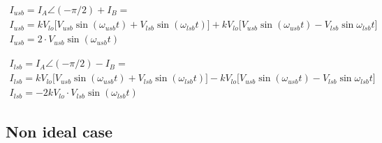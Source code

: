 \begin{gather}
    I_{usb} = I_{A}\angle{(-\pi/2)} + I_{B} = \\ 
    I_{usb} = kV_{lo}\big[ V_{usb}\sin(\omega_{usb}t)+V_{lsb}\sin(\omega_{lsb}t)] + kV_{lo} \big[V_{usb}\sin(\omega_{usb}t)-V_{lsb}\sin{\omega_{lsb}t}
    \big]\\
    I_{usb} = 2\cdot V_{usb}\sin(\omega_{usb}t)
\end{gather}

\begin{gather}
    I_{lsb} = I_{A}\angle{(-\pi/2)} - I_{B} = \\ 
    I_{lsb} = kV_{lo}\big[ V_{usb}\sin(\omega_{usb}t)+V_{lsb}\sin(\omega_{lsb}t)] - kV_{lo} \big[V_{usb}\sin(\omega_{usb}t)-V_{lsb}\sin{\omega_{lsb}t}
    \big]\\
    I_{lsb} = -2kV_{lo}\cdot V_{lsb}\sin(\omega_{lsb}t)
\end{gather}

\subsection{Non ideal case}


